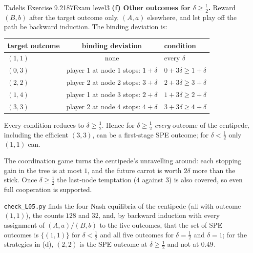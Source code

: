 \begin{exsol}{Tadelis Exercise 9.2}{187}{Exam level}{3}
\textbf{(f) Other outcomes for $\delta \ge \frac12$.} Reward $(B,b)$ after the target outcome only, $(A,a)$
elsewhere, and let play off the path be backward induction. The binding deviation is:
\begin{center}
\begin{tabular}{lcl}
\toprule
target outcome & binding deviation & condition \\
\midrule
$(1,1)$ & none & every $\delta$ \\
$(0,3)$ & player 1 at node 1 stops: $1 + \delta$ & $0 + 3\delta \ge 1 + \delta$ \\
$(2,2)$ & player 2 at node 2 stops: $3 + \delta$ & $2 + 3\delta \ge 3 + \delta$ \\
$(1,4)$ & player 1 at node 3 stops: $2 + \delta$ & $1 + 3\delta \ge 2 + \delta$ \\
$(3,3)$ & player 2 at node 4 stops: $4 + \delta$ & $3 + 3\delta \ge 4 + \delta$ \\
\bottomrule
\end{tabular}
\end{center}
Every condition reduces to $\delta \ge \frac12$. Hence for $\delta \ge \frac12$ \emph{every} outcome of the
centipede, including the efficient $(3,3)$, can be a first-stage SPE outcome; for $\delta < \frac12$ only
$(1,1)$ can.

\interp The coordination game turns the centipede's unravelling around: each stopping gain in the tree is at
most $1$, and the future carrot is worth $2\delta$ more than the stick. Once $\delta \ge \frac12$ the
last-node temptation ($4$ against $3$) is also covered, so even full cooperation is supported.

\verify \texttt{check\_L05.py} finds the four Nash equilibria of the centipede (all with outcome $(1,1)$), the
counts $128$ and $32$, and, by backward induction with every assignment of $(A,a)/(B,b)$ to the five outcomes,
that the set of SPE outcomes is $\{(1,1)\}$ for $\delta < \frac12$ and all five outcomes for $\delta = \frac12$ and
$\delta = 1$; for the strategies in (d), $(2,2)$ is the SPE outcome at $\delta \ge \frac12$ and not at $0.49$.

\end{exsol}

